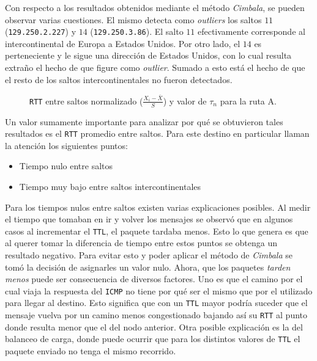 Con respecto a los resultados obtenidos mediante el método \emph{Cimbala}, se
pueden observar varias cuestiones. El mismo detecta como \emph{outliers} los
saltos $11$ (\texttt{129.250.2.227}) y $14$ (\texttt{129.250.3.86}). El salto
$11$ efectivamente corresponde al intercontinental de Europa a Estados Unidos.
Por otro lado, el $14$ es perteneciente y le sigue una dirección de Estados Unidos,
con lo cual resulta extraño el hecho de que figure como \emph{outlier}. Sumado a
esto está el hecho de que el resto de los saltos intercontinentales no fueron
detectados.

\begin{figure}[H]
    \caption{\texttt{RTT} entre saltos normalizado ($\frac{X_i-\bar{X}}{S}$)
    y valor de $\tau_n$ para la ruta A.}
    \label{res:escA:rttnorm}
\end{figure}

Un valor sumamente importante para analizar por qué se obtuvieron tales
resultados es el \texttt{RTT} promedio entre saltos. Para este destino en
particular llaman la atención los siguientes puntos:

\begin{itemize}
    \item Tiempo nulo entre saltos
    \item Tiempo muy bajo entre saltos intercontinentales
\end{itemize}

Para los tiempos nulos entre saltos existen varias explicaciones posibles. Al
medir el tiempo que tomaban en ir y volver los mensajes se observó que en
algunos casos al incrementar el \texttt{TTL}, el paquete tardaba menos. Esto lo
que genera es que al querer tomar la diferencia de tiempo entre estos puntos se
obtenga un resultado negativo. Para evitar esto y poder aplicar el método de
\emph{Cimbala} se tomó la decisión de asignarles un valor nulo. Ahora, que los
paquetes \emph{tarden menos} puede ser consecuencia de diversos factores. Uno es
que el camino por el cual viaja la respuesta del \texttt{ICMP} no tiene por qué
ser el mismo que por el utilizado para llegar al destino.  Esto significa que con un
\texttt{TTL} mayor podría suceder que el mensaje vuelva por un camino menos
congestionado bajando así su \texttt{RTT} al punto donde resulta menor que el
del nodo anterior. Otra posible explicación es la del balanceo de carga, donde
puede ocurrir que para los distintos valores de \texttt{TTL} el paquete enviado
no tenga el mismo recorrido.

